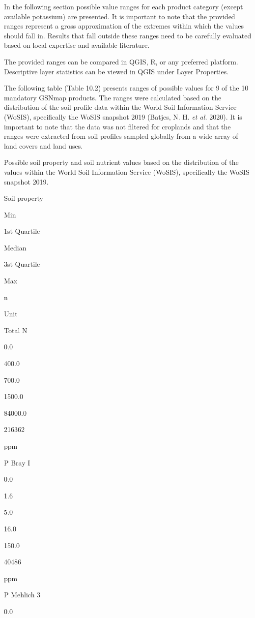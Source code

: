 \documentclass[
  10pt,
  b5paper,
  oneside]{book}
\begin{document}
In the following section possible value ranges for each product category (except available potassium) are presented. It is important to note that the provided ranges represent a gross approximation of the extremes within which the values should fall in. Results that fall outside these ranges need to be carefully evaluated based on local expertise and available literature.

The provided ranges can be compared in QGIS, R, or any preferred platform. Descriptive layer statistics can be viewed in QGIS under Layer Properties.

The following table (Table 10.2) presents ranges of possible values for 9 of the 10 mandatory GSNmap products. The ranges were calculated based on the distribution of the soil profile data within the World Soil Information Service (WoSIS), specifically the WoSIS snapshot 2019 (Batjes, N. H. \emph{et al.} 2020). It is important to note that the data was not filtered for croplands and that the ranges were extracted from soil profiles sampled globally from a wide array of land covers and land uses.

\label{tab:ranges}\label{tab:ranges}Possible soil property and soil nutrient values based on the distribution of the values within the World Soil Information Service (WoSIS), specifically the WoSIS snapshot 2019.

Soil property

Min

1st Quartile

Median

3st Quartile

Max

n

Unit

Total N

0.0

400.0

700.0

1500.0

84000.0

216362

ppm

P Bray I

0.0

1.6

5.0

16.0

150.0

40486

ppm

P Mehlich 3

0.0
\end{document}
